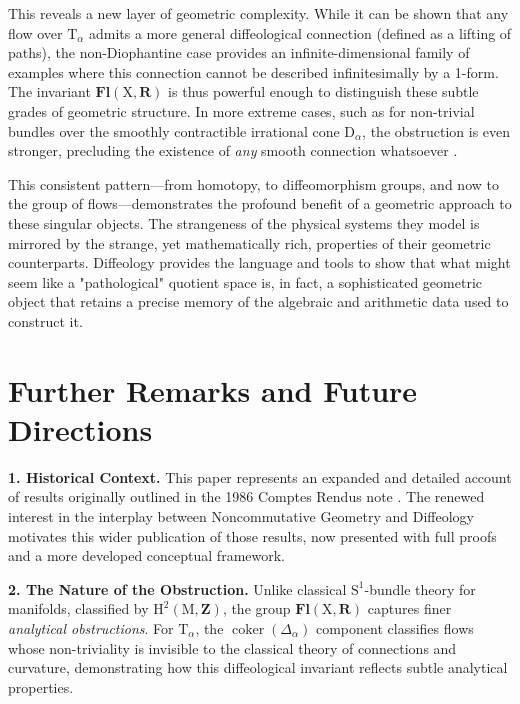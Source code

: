 \documentclass[10pt,letterpaper,reqno]{amsart}
\theoremstyle{article}
\newcommand{\1}{{\hat 1}}
\newcommand{\0}{{\hat 0}}
\newcommand{\RR}{\mathbf R}
\newcommand{\ZZ}{\mathbf Z}
\def \D{\mathrm D}
\def \H{\mathrm H}
\def \M{\mathrm M}
\def \S{\mathrm S}
\def \T{\mathrm T}
\def \X{\mathrm X}
\newcommand{\coker}{\operatorname{coker}}
\DeclareMathOperator{\Fb}{\boldsymbol{\mathsf{Fl}}}
\renewcommand{\Fb}{\mathbf{Fl}}
\def \H{\mathrm H}
\begin{document}
    This reveals a new layer of geometric complexity. While it can be shown that any flow over $\T_\alpha$ admits a more general diffeological connection (defined as a lifting of paths), the non-Diophantine case provides an infinite-dimensional family of examples where this connection cannot be described infinitesimally by a 1-form. The invariant $\Fb(\X, \RR)$ is thus powerful enough to distinguish these subtle grades of geometric structure. In more extreme cases, such as for non-trivial bundles over the smoothly contractible irrational cone $\D_\alpha$, the obstruction is even stronger, precluding the existence of \emph{any} smooth connection whatsoever \cite{PIZ25b}.
    
    This consistent pattern---from homotopy, to diffeomorphism groups, and now to the group of flows---demonstrates the profound benefit of a geometric approach to these singular objects. The strangeness of the physical systems they model is mirrored by the strange, yet mathematically rich, properties of their geometric counterparts. Diffeology provides the language and tools to show that what might seem like a "pathological" quotient space is, in fact, a sophisticated geometric object that retains a precise memory of the algebraic and arithmetic data used to construct it.

    
    \section*{Further Remarks and Future Directions}
    
    \textbf{1. Historical Context.} This paper represents an expanded and detailed account of results originally outlined in the 1986 Comptes Rendus note \cite{PIZ86}. The renewed interest in the interplay between Noncommutative Geometry and Diffeology motivates this wider publication of those results, now presented with full proofs and a more developed conceptual framework.
    
    \textbf{2. The Nature of the Obstruction.} Unlike classical $\S^1$-bundle theory for manifolds, classified by $\H^2(\M, \ZZ)$, the group $\Fb(\X, \RR)$ captures finer \emph{analytical obstructions}. For $\T_\alpha$, the $\coker(\Delta_\alpha)$ component classifies flows whose non-triviality is invisible to the classical theory of connections and curvature, demonstrating how this diffeological invariant reflects subtle analytical properties.
    
\end{document}
